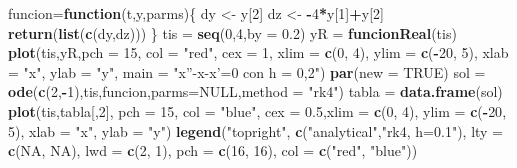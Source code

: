 \documentclass[]{article}
\newenvironment{Shaded}{\begin{snugshade}}{\end{snugshade}}
\newcommand{\KeywordTok}[1]{\textcolor[rgb]{0.13,0.29,0.53}{\textbf{#1}}}
\newcommand{\DataTypeTok}[1]{\textcolor[rgb]{0.13,0.29,0.53}{#1}}
\newcommand{\DecValTok}[1]{\textcolor[rgb]{0.00,0.00,0.81}{#1}}
\newcommand{\FloatTok}[1]{\textcolor[rgb]{0.00,0.00,0.81}{#1}}
\newcommand{\StringTok}[1]{\textcolor[rgb]{0.31,0.60,0.02}{#1}}
\newcommand{\OtherTok}[1]{\textcolor[rgb]{0.56,0.35,0.01}{#1}}
\newcommand{\ControlFlowTok}[1]{\textcolor[rgb]{0.13,0.29,0.53}{\textbf{#1}}}
\newcommand{\OperatorTok}[1]{\textcolor[rgb]{0.81,0.36,0.00}{\textbf{#1}}}
\newcommand{\NormalTok}[1]{#1}
\begin{document}
\begin{Shaded}
\begin{Highlighting}[]
\NormalTok{funcion=}\ControlFlowTok{function}\NormalTok{(t,y,parms)\{}
\NormalTok{  dy <-}\StringTok{ }\NormalTok{y[}\DecValTok{2}\NormalTok{]}
\NormalTok{  dz <-}\StringTok{ }\OperatorTok{-}\DecValTok{4}\OperatorTok{*}\NormalTok{y[}\DecValTok{1}\NormalTok{]}\OperatorTok{+}\NormalTok{y[}\DecValTok{2}\NormalTok{]}
  \KeywordTok{return}\NormalTok{(}\KeywordTok{list}\NormalTok{(}\KeywordTok{c}\NormalTok{(dy,dz)))}
\NormalTok{\}}
\NormalTok{tis =}\StringTok{ }\KeywordTok{seq}\NormalTok{(}\DecValTok{0}\NormalTok{,}\DecValTok{4}\NormalTok{,}\DataTypeTok{by =} \FloatTok{0.2}\NormalTok{)}
\NormalTok{yR =}\StringTok{ }\KeywordTok{funcionReal}\NormalTok{(tis)}
\KeywordTok{plot}\NormalTok{(tis,yR,}\DataTypeTok{pch =} \DecValTok{15}\NormalTok{, }\DataTypeTok{col =} \StringTok{"red"}\NormalTok{, }\DataTypeTok{cex =} \DecValTok{1}\NormalTok{, }\DataTypeTok{xlim =} \KeywordTok{c}\NormalTok{(}\DecValTok{0}\NormalTok{, }\DecValTok{4}\NormalTok{), }\DataTypeTok{ylim =} \KeywordTok{c}\NormalTok{(}\OperatorTok{-}\DecValTok{20}\NormalTok{, }\DecValTok{5}\NormalTok{), }\DataTypeTok{xlab =} \StringTok{"x"}\NormalTok{, }\DataTypeTok{ylab =} \StringTok{"y"}\NormalTok{, }\DataTypeTok{main =} \StringTok{"x''-x-x'=0 con h = 0,2"}\NormalTok{)}
\KeywordTok{par}\NormalTok{(}\DataTypeTok{new =} \OtherTok{TRUE}\NormalTok{)}
\NormalTok{sol =}\StringTok{ }\KeywordTok{ode}\NormalTok{(}\KeywordTok{c}\NormalTok{(}\DecValTok{2}\NormalTok{,}\OperatorTok{-}\DecValTok{1}\NormalTok{),tis,funcion,}\DataTypeTok{parms=}\OtherTok{NULL}\NormalTok{,}\DataTypeTok{method =} \StringTok{"rk4"}\NormalTok{)}
\NormalTok{tabla =}\StringTok{ }\KeywordTok{data.frame}\NormalTok{(sol)}
\KeywordTok{plot}\NormalTok{(tis,tabla[,}\DecValTok{2}\NormalTok{], }\DataTypeTok{pch =} \DecValTok{15}\NormalTok{, }\DataTypeTok{col =} \StringTok{"blue"}\NormalTok{, }\DataTypeTok{cex =} \FloatTok{0.5}\NormalTok{,}\DataTypeTok{xlim =} \KeywordTok{c}\NormalTok{(}\DecValTok{0}\NormalTok{, }\DecValTok{4}\NormalTok{), }\DataTypeTok{ylim =} \KeywordTok{c}\NormalTok{(}\OperatorTok{-}\DecValTok{20}\NormalTok{, }\DecValTok{5}\NormalTok{), }\DataTypeTok{xlab =} \StringTok{"x"}\NormalTok{, }\DataTypeTok{ylab =} \StringTok{"y"}\NormalTok{)}
\KeywordTok{legend}\NormalTok{(}\StringTok{"topright"}\NormalTok{,}
       \KeywordTok{c}\NormalTok{(}\StringTok{"analytical"}\NormalTok{,}\StringTok{"rk4, h=0.1"}\NormalTok{),}
       \DataTypeTok{lty =} \KeywordTok{c}\NormalTok{(}\OtherTok{NA}\NormalTok{, }\OtherTok{NA}\NormalTok{), }\DataTypeTok{lwd =} \KeywordTok{c}\NormalTok{(}\DecValTok{2}\NormalTok{, }\DecValTok{1}\NormalTok{),}
       \DataTypeTok{pch =} \KeywordTok{c}\NormalTok{(}\DecValTok{16}\NormalTok{, }\DecValTok{16}\NormalTok{),}
       \DataTypeTok{col =} \KeywordTok{c}\NormalTok{(}\StringTok{"red"}\NormalTok{, }\StringTok{"blue"}\NormalTok{))}
\end{Highlighting}
\end{Shaded}
\end{document}
